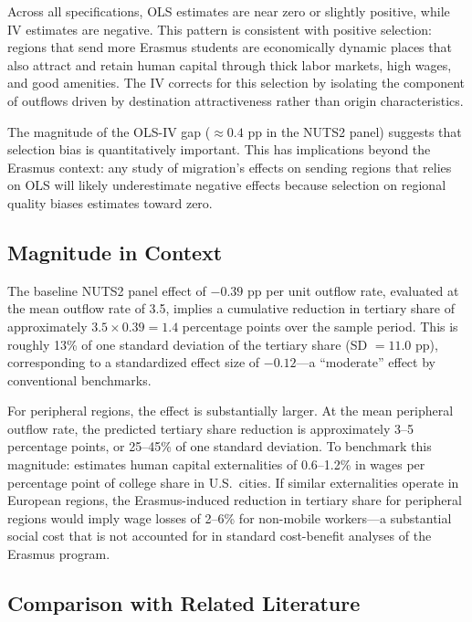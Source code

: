 \documentclass[12pt]{article}
\begin{document}
Across all specifications, OLS estimates are near zero or slightly positive, while IV estimates are negative. This pattern is consistent with positive selection: regions that send more Erasmus students are economically dynamic places that also attract and retain human capital through thick labor markets, high wages, and good amenities. The IV corrects for this selection by isolating the component of outflows driven by destination attractiveness rather than origin characteristics.

The magnitude of the OLS-IV gap ($\approx 0.4$ pp in the NUTS2 panel) suggests that selection bias is quantitatively important. This has implications beyond the Erasmus context: any study of migration's effects on sending regions that relies on OLS will likely underestimate negative effects because selection on regional quality biases estimates toward zero.

\subsection{Magnitude in Context}

The baseline NUTS2 panel effect of $-0.39$ pp per unit outflow rate, evaluated at the mean outflow rate of 3.5, implies a cumulative reduction in tertiary share of approximately $3.5 \times 0.39 = 1.4$ percentage points over the sample period. This is roughly 13\% of one standard deviation of the tertiary share (SD $= 11.0$ pp), corresponding to a standardized effect size of $-0.12$---a ``moderate'' effect by conventional benchmarks.

For peripheral regions, the effect is substantially larger. At the mean peripheral outflow rate, the predicted tertiary share reduction is approximately 3--5 percentage points, or 25--45\% of one standard deviation. To benchmark this magnitude: \citet{moretti_2004} estimates human capital externalities of 0.6--1.2\% in wages per percentage point of college share in U.S.\ cities. If similar externalities operate in European regions, the Erasmus-induced reduction in tertiary share for peripheral regions would imply wage losses of 2--6\% for non-mobile workers---a substantial social cost that is not accounted for in standard cost-benefit analyses of the Erasmus program.

\subsection{Comparison with Related Literature}
\end{document}
